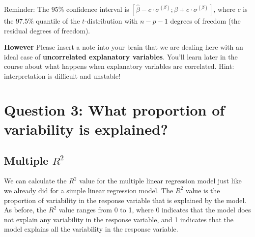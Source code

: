 \documentclass[
  letterpaper,
  8pt,
  a4paper]{book}
\begin{document}
Reminder: The 95\% confidence interval is
\([\hat\beta - c \cdot \sigma^{(\beta)} ; \hat\beta + c \cdot \sigma^{(\beta)}]\),
where \(c\) is the 97.5\% quantile of the \(t\)-distribution with
\(n-p-1\) degrees of freedom (the residual degrees of freedom).

\begin{tcolorbox}[enhanced jigsaw, arc=.35mm, bottomrule=.15mm, bottomtitle=1mm, breakable, colback=white, colbacktitle=quarto-callout-important-color!10!white, colframe=quarto-callout-important-color-frame, coltitle=black, left=2mm, leftrule=.75mm, opacityback=0, opacitybacktitle=0.6, rightrule=.15mm, title=\textcolor{quarto-callout-important-color}{\faExclamation}\hspace{0.5em}{Important}, titlerule=0mm, toprule=.15mm, toptitle=1mm]

\textbf{However} Please insert a note into your brain that we are
dealing here with an ideal case of \textbf{uncorrelated explanatory
variables}. You'll learn later in the course about what happens when
explanatory variables are correlated. Hint: interpretation is difficult
and unstable!

\end{tcolorbox}

\section*{Question 3: What proportion of variability is
explained?}\label{question-3-what-proportion-of-variability-is-explained}


\subsection*{\texorpdfstring{Multiple
\(R^2\)}{Multiple R\^{}2}}\label{multiple-r2}

We can calculate the \(R^2\) value for the multiple linear regression
model just like we already did for a simple linear regression model. The
\(R^2\) value is the proportion of variability in the response variable
that is explained by the model. As before, the \(R^2\) value ranges from
0 to 1, where 0 indicates that the model does not explain any
variability in the response variable, and 1 indicates that the model
explains all the variability in the response variable.
\end{document}
